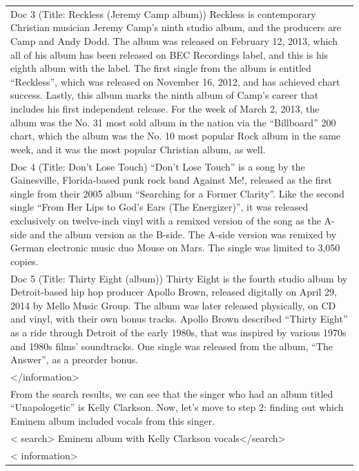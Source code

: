 \documentclass[11pt]{article}
\begin{document}
\begin{longtable}{|p{}|}
Doc 3 (Title: Reckless (Jeremy Camp album)) Reckless is contemporary Christian musician Jeremy Camp's ninth studio album, and the producers are Camp and Andy Dodd. The album was released on February 12, 2013, which all of his album has been released on BEC Recordings label, and this is his eighth album with the label. The first single from the album is entitled ``Reckless'', which was released on November 16, 2012, and has achieved chart success. Lastly, this album marks the ninth album of Camp's career that includes his first independent release. For the week of March 2, 2013, the album was the No. 31 most sold album in the nation via the ``Billboard'' 200 chart, which the album was the No. 10 most popular Rock album in the same week, and it was the most popular Christian album, as well. \\
Doc 4 (Title: Don't Lose Touch) ``Don't Lose Touch'' is a song by the Gainesville, Florida-based punk rock band Against Me!, released as the first single from their 2005 album ``Searching for a Former Clarity''. Like the second single ``From Her Lips to God's Ears (The Energizer)'', it was released exclusively on twelve-inch vinyl with a remixed version of the song as the A-side and the album version as the B-side. The A-side version was remixed by German electronic music duo Mouse on Mars. The single was limited to 3,050 copies. \\
Doc 5 (Title: Thirty Eight (album)) Thirty Eight is the fourth studio album by Detroit-based hip hop producer Apollo Brown, released digitally on April 29, 2014 by Mello Music Group. The album was later released physically, on CD and vinyl, with their own bonus tracks. Apollo Brown described ``Thirty Eight'' as a ride through Detroit of the early 1980s, that was inspired by various 1970s and 1980s films' soundtracks. One single was released from the album, ``The Answer'', as a preorder bonus. \\
\textless{}/information\textgreater{} \\
\hline
From the search results, we can see that the singer who had an album titled ``Unapologetic'' is Kelly Clarkson. Now, let's move to step 2: finding out which Eminem album included vocals from this singer. \\
\hline
\textless{} search\textgreater{} Eminem album with Kelly Clarkson vocals\textless{}/search\textgreater{} \\
\hline
\textless{} information\textgreater{} \\

\end{longtable}
\end{document}

